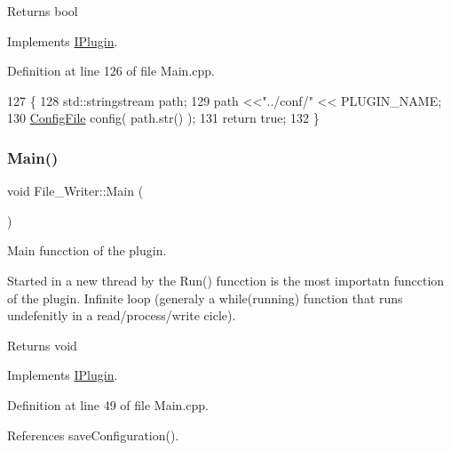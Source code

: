 \begin{DoxyReturn}{Returns}
bool 
\end{DoxyReturn}


Implements \hyperlink{class_i_plugin_a418cff309436d3a15d9a4ce7369db6dd}{I\+Plugin}.



Definition at line 126 of file Main.\+cpp.


\begin{DoxyCode}
127 \{
128     std::stringstream path;
129     path <<\textcolor{stringliteral}{"../conf/"} << PLUGIN\_NAME;
130     \hyperlink{class_config_file}{ConfigFile} config( path.str() );
131     \textcolor{keywordflow}{return} \textcolor{keyword}{true};
132 \}
\end{DoxyCode}
\mbox{\label{class_file___writer_a0738556056b69f64bf524fee06a6e69f}} 
\subsubsection{\texorpdfstring{Main()}{Main()}}
{\footnotesize\ttfamily void File\+\_\+\+Writer\+::\+Main (\begin{DoxyParamCaption}{ }\end{DoxyParamCaption})\hspace{0.3cm}{\ttfamily [virtual]}}



Main funcction of the plugin. 

Started in a new thread by the Run() funcction is the most importatn funcction of the plugin. Infinite loop (generaly a while(running) function that runs undefenitly in a read/process/write cicle). \begin{DoxyReturn}{Returns}
void 
\end{DoxyReturn}


Implements \hyperlink{class_i_plugin_ab5fdb3b0f7afdcee04324dca01766749}{I\+Plugin}.



Definition at line 49 of file Main.\+cpp.



References save\+Configuration().


